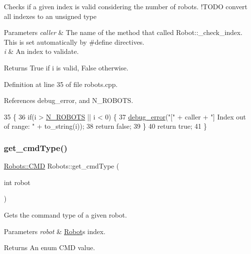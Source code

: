 Checks if a given index is valid considering the number of robots. !\+T\+O\+DO convert all indexes to an unsigned type 
\begin{DoxyParams}{Parameters}
{\em caller} & The name of the method that called Robot\+::\+\_\+check\+\_\+index. This is set automatically by \#define directives. \\
\hline
{\em i} & An index to validate. \\
\hline
\end{DoxyParams}
\begin{DoxyReturn}{Returns}
True if \textquotesingle{}i\textquotesingle{} is valid, False otherwise. 
\end{DoxyReturn}


Definition at line 35 of file robots.\+cpp.



References debug\+\_\+error, and N\+\_\+\+R\+O\+B\+O\+TS.


\begin{DoxyCode}
35                                                         \{
36     \textcolor{keywordflow}{if}(i > \hyperlink{robots_8hpp_a11f808c4481e347f5ea9a10237470606}{N\_ROBOTS} || i < 0) \{
37         \hyperlink{debug_8hpp_ab163a9e3f1ed9f61bd7d743fdf4a161a}{debug\_error}(\textcolor{stringliteral}{"["} + caller + \textcolor{stringliteral}{"] Index out of range: "} + to\_string(i));
38         \textcolor{keywordflow}{return} \textcolor{keyword}{false};
39     \}
40     \textcolor{keywordflow}{return} \textcolor{keyword}{true};
41 \}
\end{DoxyCode}
\mbox{\label{class_robots_abc1028ef8481db1426eb5a093c554ac9}} 
\subsubsection{\texorpdfstring{get\+\_\+cmd\+Type()}{get\_cmdType()}}
{\footnotesize\ttfamily \hyperlink{class_robots_adcc7ae7fbb9bdc57a26ee70fa1ae88e5}{Robots\+::\+C\+MD} Robots\+::get\+\_\+cmd\+Type (\begin{DoxyParamCaption}\item[{int}]{robot }\end{DoxyParamCaption})\hspace{0.3cm}{\ttfamily [static]}}

Gets the command type of a given robot. 
\begin{DoxyParams}{Parameters}
{\em robot} & \hyperlink{struct_robots_1_1_robot}{Robot}\textquotesingle{}s index. \\
\hline
\end{DoxyParams}
\begin{DoxyReturn}{Returns}
An enum C\+MD value. 
\end{DoxyReturn}


